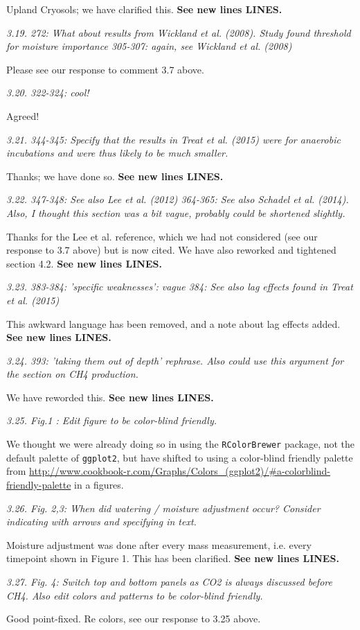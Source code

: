 \documentclass[11pt, oneside]{article}
\begin{document}
Upland Cryosols; we have clarified this. {\bf See new lines LINES.}

\medskip
{\it 3.19. 272: What about results from Wickland et al. (2008). Study found threshold for moisture importance
305-307: again, see Wickland et al. (2008) }

Please see our response to comment 3.7 above.

\medskip
{\it 3.20. 322-324: cool! }

Agreed!

\medskip
{\it 3.21. 344-345: Specify that the results in Treat et al. (2015) were for anaerobic incubations and were thus likely to be much smaller. }

Thanks; we have done so. {\bf See new lines LINES.}

\medskip
{\it 3.22. 347-348: See also Lee et al. (2012)
364-365: See also Schadel et al. (2014). Also, I thought this section was a bit vague, probably could be shortened slightly. }

Thanks for the Lee et al. reference, which we had not considered (see our response to 3.7 above) but is now cited. We have also reworked and tightened section 4.2. {\bf See new lines LINES.}

\medskip
{\it 3.23. 383-384: 'specific weaknesses': vague
384: See also lag effects found in Treat et al. (2015) }

This awkward language has been removed, and a note about lag effects added. {\bf See new lines LINES.}

\medskip
{\it 3.24. 393: 'taking them out of depth' rephrase. Also could use this argument for the section on CH4 production. }

We have reworded this. {\bf See new lines LINES.}

\medskip
{\it 3.25. Fig.1 : Edit figure to be color-blind friendly. }

We thought we were already doing so in using the {\tt RColorBrewer} package, not the default palette of {\tt ggplot2}, but have shifted to using a color-blind friendly palette from \url{http://www.cookbook-r.com/Graphs/Colors_(ggplot2)/#a-colorblind-friendly-palette} in a figures.

\medskip
{\it 3.26. Fig. 2,3: When did watering / moisture adjustment occur? Consider indicating with arrows and specifying in text. }

Moisture adjustment was done after every mass measurement, i.e. every timepoint shown in Figure 1. This has been clarified. {\bf See new lines LINES.}

\medskip
{\it 3.27. Fig. 4: Switch top and bottom panels as CO2 is always discussed before CH4. Also edit colors and patterns to be color-blind friendly. }

Good point-fixed. Re colors, see our response to 3.25 above.
\end{document}
